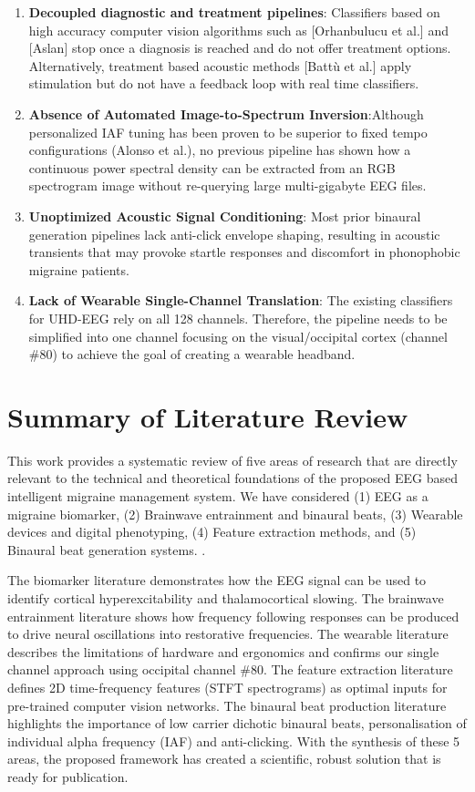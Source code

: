 \documentclass[12pt, a4paper]{report}
\begin{document}
\begin{enumerate}
    \item \textbf{Decoupled diagnostic and treatment pipelines}: Classifiers based on high accuracy computer vision algorithms such as [Orhanbulucu et al.] and [Aslan] stop once a diagnosis is reached and do not offer treatment options. Alternatively, treatment based acoustic methods [Batt\`u et al.] apply stimulation but do not have a feedback loop with real time classifiers.
    \item \textbf{Absence of Automated Image-to-Spectrum Inversion}:Although personalized IAF tuning has been proven to be superior to fixed tempo configurations (Alonso et al.), no previous pipeline has shown how a continuous power spectral density can be extracted from an RGB spectrogram image without re-querying large multi-gigabyte EEG files.
    \item \textbf{Unoptimized Acoustic Signal Conditioning}: Most prior binaural generation pipelines lack anti-click envelope shaping, resulting in acoustic transients that may provoke startle responses and discomfort in phonophobic migraine patients.
    \item \textbf{Lack of Wearable Single-Channel Translation}:  The existing classifiers for UHD-EEG rely on all 128 channels. Therefore, the pipeline needs to be simplified into one channel focusing on the visual/occipital cortex (channel \#80) to achieve the goal of creating a wearable headband.
\end{enumerate}

\section{Summary of Literature Review}
\label{sec:literature_summary}
This work provides a systematic review of five areas of research that are directly relevant to the technical and theoretical foundations of the proposed EEG based intelligent migraine management system. We have considered (1) EEG as a migraine biomarker, (2) Brainwave entrainment and binaural beats, (3) Wearable devices and digital phenotyping, (4) Feature extraction methods, and (5) Binaural beat generation systems. .





The biomarker literature demonstrates how the EEG signal can be used to identify cortical hyperexcitability and thalamocortical slowing. The brainwave entrainment literature shows how frequency following responses can be produced to drive neural oscillations into restorative frequencies. The wearable literature describes the limitations of hardware and ergonomics and confirms our single channel approach using occipital channel \#80. The feature extraction literature defines 2D time-frequency features (STFT spectrograms) as optimal inputs for pre-trained computer vision networks. The binaural beat production literature highlights the importance of low carrier dichotic binaural beats, personalisation of individual alpha frequency (IAF) and anti-clicking. With the synthesis of these 5 areas, the proposed framework has created a scientific, robust solution that is ready for publication.
\end{document}
